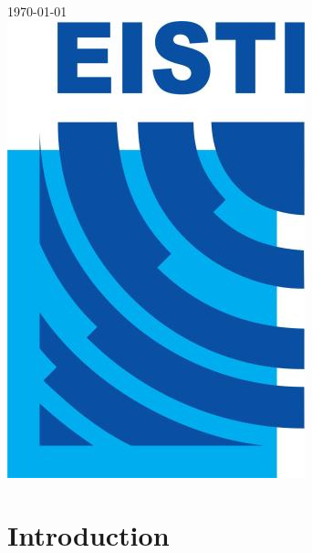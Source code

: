 \documentclass[12pt]{article}
\begin{document}
\begin{titlepage}

{\large \today}\\[3cm] %


\includegraphics[scale=.25]{EISTI.jpg}\\[1cm] %
 

\vfill %

\end{titlepage}
\renewcommand{\contentsname}{Sommaire}
\doublespacing
\tableofcontents
\singlespacing

\newpage



\section*{Introduction}
\end{document}

